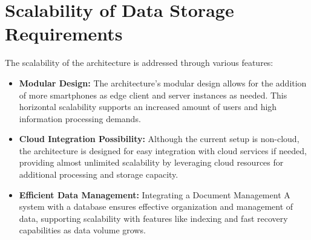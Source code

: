 \section{Scalability of Data Storage Requirements}
The scalability of the architecture is addressed through various features:

\begin{itemize}
    \item \textbf{Modular Design:} The architecture's modular design allows for
          the addition of more smartphones as edge client and server instances
          as needed. This horizontal scalability supports an increased amount of
          users and high information processing demands.
    \item \textbf{Cloud Integration Possibility:} Although the current setup is
          non-cloud, the architecture is designed for easy integration with
          cloud services if needed, providing almost unlimited scalability by
          leveraging cloud resources for additional processing and storage
          capacity.
    \item \textbf{Efficient Data Management:} Integrating a Document Management
          A system with a database ensures effective organization and management
          of data, supporting scalability with features like indexing and fast
          recovery capabilities as data volume grows.
\end{itemize}